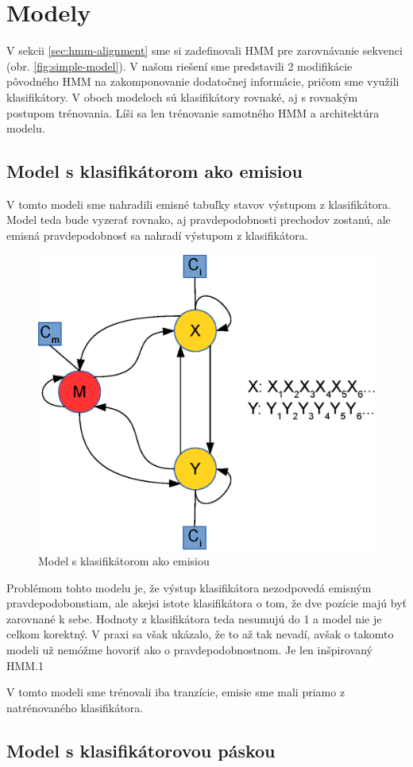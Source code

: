 \chapter{Modely}

V sekcii \ref{sec:hmm-alignment} sme si zadefinovali HMM pre zarovnávanie sekvenci (obr. \ref{fig:simple-model}).
V našom riešení sme predstavili 2 modifikácie pôvodného HMM na zakomponovanie dodatočnej informácie, pričom sme využili klasifikátory. V oboch modeloch sú klasifikátory rovnaké, aj s rovnakým postupom trénovania. Líši sa len trénovanie samotného HMM a architektúra modelu.

\section{Model s klasifikátorom ako emisiou}

V tomto modeli sme nahradili emisné tabuľky stavov výstupom z klasifikátora.
Model teda bude vyzerať rovnako, aj pravdepodobnosti prechodov zostanú, ale emisná pravdepodobnosť sa nahradí výstupom z klasifikátora.

\begin{figure}[htp]
    \centering
    \includegraphics[width=.5\textwidth]{images/model_clf}
    \caption{Model s klasifikátorom ako emisiou}
\end{figure}


Problémom tohto modelu je, že výstup klasifikátora nezodpovedá emisným pravdepodobonstiam, ale akejsi istote klasifikátora o tom, že dve pozície majú byť zarovnané k sebe. Hodnoty z klasifikátora teda nesumujú do 1 a model nie je celkom korektný. V praxi sa však ukázalo, že to až tak nevadí, avšak o takomto modeli už nemóžme hovoriť ako o pravdepodobnostnom. Je len inšpirovaný HMM.1

V tomto modeli sme trénovali iba tranzície, emisie sme mali priamo z natrénovaného klasifikátora.

\section{Model s klasifikátorovou páskou}

